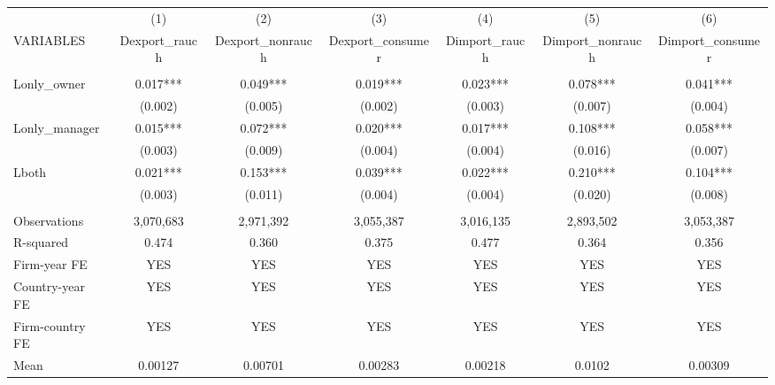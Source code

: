 \begin{tabular}{lcccccc} \hline
 & (1) & (2) & (3) & (4) & (5) & (6) \\
VARIABLES & Dexport\_rauch & Dexport\_nonrauch & Dexport\_consumer & Dimport\_rauch & Dimport\_nonrauch & Dimport\_consumer \\ \hline
 &  &  &  &  &  &  \\
Lonly\_owner & 0.017*** & 0.049*** & 0.019*** & 0.023*** & 0.078*** & 0.041*** \\
 & (0.002) & (0.005) & (0.002) & (0.003) & (0.007) & (0.004) \\
Lonly\_manager & 0.015*** & 0.072*** & 0.020*** & 0.017*** & 0.108*** & 0.058*** \\
 & (0.003) & (0.009) & (0.004) & (0.004) & (0.016) & (0.007) \\
Lboth & 0.021*** & 0.153*** & 0.039*** & 0.022*** & 0.210*** & 0.104*** \\
 & (0.003) & (0.011) & (0.004) & (0.004) & (0.020) & (0.008) \\
 &  &  &  &  &  &  \\
Observations & 3,070,683 & 2,971,392 & 3,055,387 & 3,016,135 & 2,893,502 & 3,053,387 \\
R-squared & 0.474 & 0.360 & 0.375 & 0.477 & 0.364 & 0.356 \\
Firm-year FE & YES & YES & YES & YES & YES & YES \\
Country-year FE & YES & YES & YES & YES & YES & YES \\
Firm-country FE & YES & YES & YES & YES & YES & YES \\
 Mean & 0.00127 & 0.00701 & 0.00283 & 0.00218 & 0.0102 & 0.00309 \\ \hline
\end{tabular}
